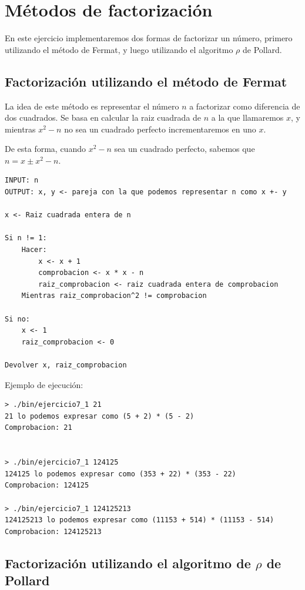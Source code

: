 \documentclass[12pt, spanish]{article}
\begin{document}
\section{Métodos de factorización}

En este ejercicio implementaremos dos formas de factorizar un número, primero utilizando el método de Fermat, y luego utilizando el algoritmo $\rho$ de Pollard.

\subsection{Factorización utilizando el método de Fermat}

La idea de este método es representar el número $n$ a factorizar como diferencia de dos cuadrados. Se basa en calcular la raiz cuadrada de $n$ a la que llamaremos $x$, y mientras $x^2 - n$ no sea un cuadrado perfecto incrementaremos en uno $x$.

De esta forma, cuando $x^2 - n$ sea un cuadrado perfecto, sabemos que $n = x \pm x^2 - n$.


\begin{lstlisting}[caption={Algoritmo raices cuadradas mod p*q}]
INPUT: n
OUTPUT: x, y <- pareja con la que podemos representar n como x +- y

x <- Raiz cuadrada entera de n

Si n != 1:
 	Hacer:
		x <- x + 1
		comprobacion <- x * x - n
		raiz_comprobacion <- raiz cuadrada entera de comprobacion
	Mientras raiz_comprobacion^2 != comprobacion

Si no:
	x <- 1
	raiz_comprobacion <- 0

Devolver x, raiz_comprobacion
\end{lstlisting}


Ejemplo de ejecución:

\begin{lstlisting}
> ./bin/ejercicio7_1 21
21 lo podemos expresar como (5 + 2) * (5 - 2)
Comprobacion: 21


> ./bin/ejercicio7_1 124125
124125 lo podemos expresar como (353 + 22) * (353 - 22)
Comprobacion: 124125

> ./bin/ejercicio7_1 124125213
124125213 lo podemos expresar como (11153 + 514) * (11153 - 514)
Comprobacion: 124125213
\end{lstlisting}


\subsection{Factorización utilizando el algoritmo de $\rho$ de Pollard}
\end{document}
